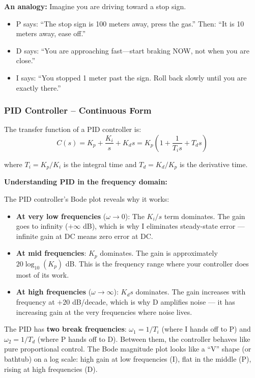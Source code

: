 \textbf{An analogy:} Imagine you are driving toward a stop sign.
\begin{itemize}
    \item P says: ``The stop sign is 100 meters away, press the gas.'' Then: ``It is 10 meters away, ease off.''
    \item D says: ``You are approaching fast---start braking NOW, not when you are close.''
    \item I says: ``You stopped 1 meter past the sign. Roll back slowly until you are exactly there.''
\end{itemize}

\subsubsection{PID Controller -- Continuous Form}

The transfer function of a PID controller is:
\begin{equation}
C(s) = K_p + \frac{K_i}{s} + K_d s = K_p \left(1 + \frac{1}{T_i s} + T_d s\right)
\end{equation}

where $T_i = K_p / K_i$ is the integral time and $T_d = K_d / K_p$ is the derivative time.

\textbf{Understanding PID in the frequency domain:}

The PID controller's Bode plot reveals why it works:
\begin{itemize}
    \item \textbf{At very low frequencies} ($\omega \to 0$): The $K_i/s$ term dominates. The gain goes to infinity ($+\infty$ dB), which is why I eliminates steady-state error --- infinite gain at DC means zero error at DC.
    \item \textbf{At mid frequencies}: $K_p$ dominates. The gain is approximately $20\log_{10}(K_p)$ dB. This is the frequency range where your controller does most of its work.
    \item \textbf{At high frequencies} ($\omega \to \infty$): $K_d s$ dominates. The gain increases with frequency at $+20$ dB/decade, which is why D amplifies noise --- it has increasing gain at the very frequencies where noise lives.
\end{itemize}

The PID has \textbf{two break frequencies}: $\omega_1 = 1/T_i$ (where I hands off to P) and $\omega_2 = 1/T_d$ (where P hands off to D). Between them, the controller behaves like pure proportional control. The Bode magnitude plot looks like a ``V'' shape (or bathtub) on a log scale: high gain at low frequencies (I), flat in the middle (P), rising at high frequencies (D).

